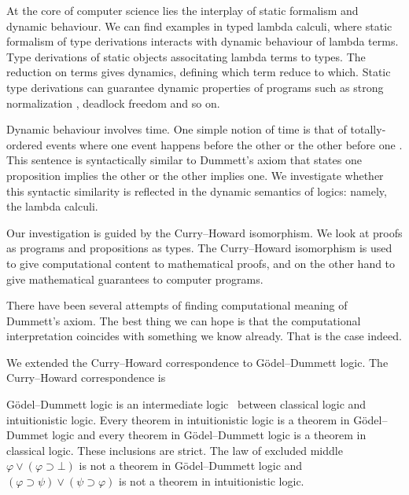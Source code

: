 
At the core of computer science lies the interplay of static formalism
and dynamic behaviour.  We can find examples in typed lambda calculi,
where static formalism of type derivations interacts with dynamic
behaviour of lambda terms.
Type derivations of static objects associtating lambda terms to types.
The reduction on terms gives dynamics, defining which term reduce
to which.  Static type derivations can guarantee dynamic properties of
programs such as strong normalization ,
deadlock freedom 
and so on.

Dynamic behaviour involves time.
One simple notion of time is that of totally-ordered events where
one event happens before the other or the other before one .
This sentence is syntactically similar to Dummett's axiom that states
one proposition implies the other or the other implies one.
We investigate whether this syntactic similarity is reflected
in the dynamic semantics of logics: namely, the lambda calculi.


Our investigation is guided by the Curry--Howard isomorphism.
We look at proofs as programs and propositions as types.
The Curry--Howard isomorphism is used to give computational content
to mathematical proofs, and on the other hand to give mathematical
guarantees to computer programs.


There have been several attempts of finding computational meaning of
Dummett's axiom.  
The best thing we can hope is that the computational
interpretation coincides with something we know already.
That is the case indeed.

We extended the Curry--Howard correspondence to G\"odel--Dummett logic.
The Curry--Howard correspondence is 

G\"odel--Dummett logic is an intermediate logic~\citep{umezawa} between
classical logic and intuitionistic logic.  Every theorem in
intuitionistic logic is a theorem in G\"odel--Dummet logic and every
theorem in G\"odel--Dummett logic is a theorem in classical logic.
These inclusions are strict.  The law of excluded middle
$\varphi\vee(\varphi\supset \bot)$ is not a theorem in G\"odel--Dummett
logic and $(\varphi\supset\psi)\vee(\psi\supset\varphi)$ is not a
theorem in intuitionistic logic.

